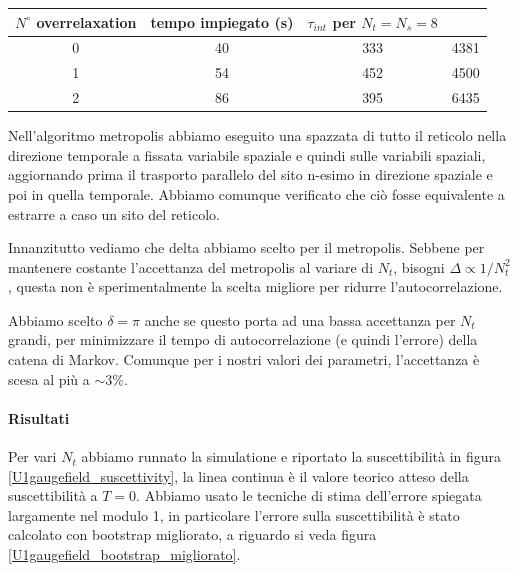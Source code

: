 \documentclass[a4paper, 12pt]{article}
\begin{document}
\begin{center}
\begin{tabular}{ c | c | c | c }
\label{benchmark_U1gauge_field}
$N^{\circ}$ overrelaxation & tempo impiegato (s) &
$\tau_{int}$ per $N_t = N_s = 8$ \\
\hline
0 & 40 & 333 & 4381 \\
1 & 54 & 452 & 4500 \\
2 & 86 & 395 & 6435 \\
\end{tabular}
\end{center}

Nell'algoritmo metropolis abbiamo eseguito una spazzata di tutto il reticolo
nella direzione temporale a fissata variabile spaziale e quindi sulle variabili
spaziali, aggiornando prima il trasporto parallelo del sito n-esimo
in direzione spaziale e poi in quella temporale.
Abbiamo comunque verificato che ciò fosse equivalente a estrarre a caso
un sito del reticolo.

Innanzitutto vediamo che delta abbiamo scelto per il metropolis.
Sebbene per mantenere costante l'accettanza del metropolis al variare di $N_t$,
bisogni $\Delta \propto 1 / N_t^2$, questa non è sperimentalmente la scelta
migliore per ridurre l'autocorrelazione.

Abbiamo scelto $\delta = \pi$ anche se questo porta ad una bassa accettanza per
$N_t$ grandi, per minimizzare il tempo di autocorrelazione (e quindi l'errore)
della catena di Markov. Comunque per i nostri valori dei parametri,
l'accettanza è scesa al più a $\sim 3 \%$.

\paragraph{Risultati}
Per vari $N_t$ abbiamo runnato la simulatione e riportato la suscettibilità
in figura \ref{U1gaugefield_suscettivity}, la linea continua è il valore teorico
atteso della suscettibilità a $T=0$.
Abbiamo usato le tecniche di stima dell'errore spiegata largamente nel modulo 1,
in particolare l'errore sulla suscettibilità è stato calcolato con bootstrap
migliorato, a riguardo si veda figura \ref{U1gaugefield_bootstrap_migliorato}.
\end{document}
